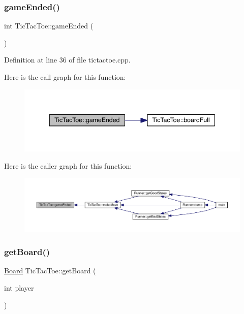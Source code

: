 \subsubsection{\texorpdfstring{game\+Ended()}{gameEnded()}}
{\footnotesize\ttfamily int Tic\+Tac\+Toe\+::game\+Ended (\begin{DoxyParamCaption}{ }\end{DoxyParamCaption})}



Definition at line 36 of file tictactoe.\+cpp.

Here is the call graph for this function\+:\nopagebreak
\begin{figure}[H]
\begin{center}
\leavevmode
\includegraphics[width=344pt]{class_tic_tac_toe_a0ed1b3b4b699af8e7db79f502cbc9531_cgraph}
\end{center}
\end{figure}
Here is the caller graph for this function\+:\nopagebreak
\begin{figure}[H]
\begin{center}
\leavevmode
\includegraphics[width=350pt]{class_tic_tac_toe_a0ed1b3b4b699af8e7db79f502cbc9531_icgraph}
\end{center}
\end{figure}
\mbox{\label{class_tic_tac_toe_aeacd5865fa7f87f6fd9608b8ed1743a9}} 
\subsubsection{\texorpdfstring{get\+Board()}{getBoard()}}
{\footnotesize\ttfamily \hyperlink{constants_8h_af901d0acc1572fb0c779f84ddd2c6ce8}{Board} Tic\+Tac\+Toe\+::get\+Board (\begin{DoxyParamCaption}\item[{int}]{player }\end{DoxyParamCaption})}



